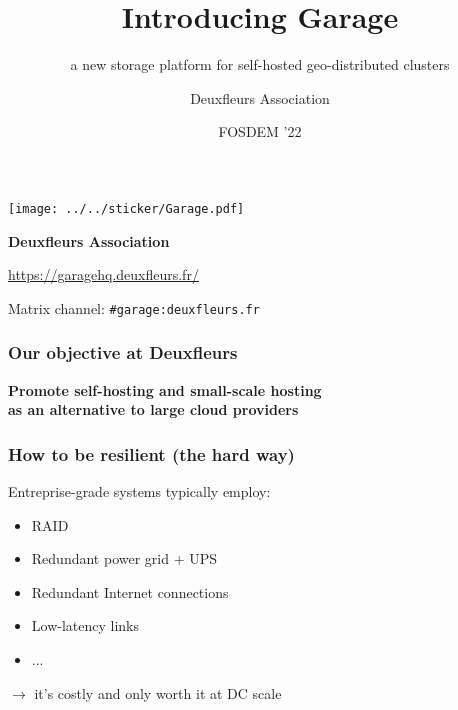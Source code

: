 \documentclass[aspectratio=169]{beamer}
\title{Introducing Garage}
\subtitle{a new storage platform for self-hosted geo-distributed clusters}
\author{Deuxfleurs Association}
\date{FOSDEM '22}
\begin{document}
\begin{frame}
	\centering
	\texttt{[image: ../../sticker/Garage.pdf]}
	\vspace{1em}

	{\large\bf Deuxfleurs Association}
	\vspace{1em}

	\url{https://garagehq.deuxfleurs.fr/}

	Matrix channel: \texttt{\#garage:deuxfleurs.fr}
\end{frame}

\begin{frame}
	\frametitle{Our objective at Deuxfleurs}
	
	\begin{center}
		\textbf{Promote self-hosting and small-scale hosting\\
			as an alternative to large cloud providers}
	\end{center}
	\vspace{2em}
\end{frame}

\begin{frame}
	\frametitle{How to be resilient (the hard way)}

	Entreprise-grade systems typically employ:
	\vspace{1em}
	\begin{itemize}
		\item RAID
		\item Redundant power grid + UPS
		\item Redundant Internet connections
		\item Low-latency links
		\item ... 
	\end{itemize}
	\vspace{1em}
	$\to$ it's costly and only worth it at DC scale
\end{frame}
\end{document}
